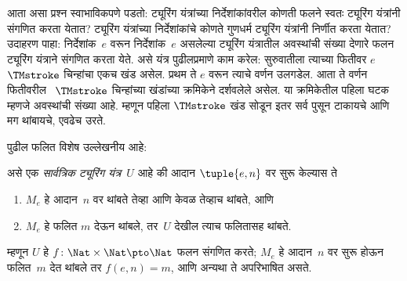 आता असा प्रश्न स्वाभाविकपणे पडतो: ट्यूरिंग
यंत्रांच्या निर्देशांकांवरील कोणती फलने स्वतः
ट्यूरिंग यंत्रांनी संगणित करता येतात? ट्यूरिंग
यंत्रांच्या निर्देशांकांचे कोणते गुणधर्म ट्यूरिंग
यंत्रांनी निर्णीत करता येतात? उदाहरण पाहा:
निर्देशांक~$e$ वरून निर्देशांक~$e$ असलेल्या
ट्यूरिंग यंत्रातील अवस्थांची संख्या देणारे
फलन ट्यूरिंग यंत्राने संगणित करता येते.
असे यंत्र पुढीलप्रमाणे काम करेल: सुरुवातीला
त्याच्या फितीवर $e$~$\TMstroke$ चिन्हांचा
एकच खंड असेल. प्रथम ते $e$ वरून त्याचे
वर्णन उलगडेल. आता ते वर्णन फितीवरील
~$\TMstroke$ चिन्हांच्या खंडांच्या क्रमिकेने
दर्शवलेले असेल. या क्रमिकेतील पहिला
घटक म्हणजे अवस्थांची संख्या आहे.
म्हणून पहिला $\TMstroke$ खंड सोडून इतर
सर्व पुसून टाकायचे आणि मग थांबायचे, एवढेच
उरते.

पुढील फलित विशेष उल्लेखनीय आहे:

\begin{thm}\label{tur:und:uni:thm:universal-tm} असे एक \emph{सार्वत्रिक
  ट्यूरिंग यंत्र}~$U$ आहे की आदान $\tuple{e,n}$ वर
  सुरू केल्यास ते
  \begin{enumerate}
    \item $M_e$ हे आदान~$n$ वर थांबते तेव्हा आणि केवळ तेव्हाच थांबते, आणि
    \item $M_e$ हे फलित $m$ देऊन थांबले, तर~$U$ देखील
    त्याच फलितासह थांबते.
  \end{enumerate}
  म्हणून $U$ हे $f\colon \Nat \times \Nat \pto \Nat$
  फलन संगणित करते; $M_e$ हे आदान~$n$ वर सुरू
  होऊन फलित~$m$ देत थांबले तर $f(e,n) = m$,
  आणि अन्यथा ते अपरिभाषित असते.
\end{thm}

